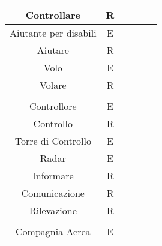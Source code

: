 \begin{tabular}{ | c  c  c | c  c  c | }
	\hline
	\textsf{\small Controllare} & \textsf{\small R} & \textsf{\small $ $} & \textsf{\small } & \textsf{\small } & \textsf{\small $ $}\\
	\hline
	\textsf{\small Aiutante per disabili} & \textsf{\small E} & \textsf{\small $ $} & \textsf{\small } & \textsf{\small } & \textsf{\small $ $}\\
	\hline
	\textsf{\small Aiutare} & \textsf{\small R} & \textsf{\small $ $} & \textsf{\small } & \textsf{\small } & \textsf{\small $ $}\\
	\hline
	\textsf{\small Volo} & \textsf{\small E} & \textsf{\small $ $} & \textsf{\small } & \textsf{\small } & \textsf{\small $ $}\\
	\hline
	\textsf{\small Volare} & \textsf{\small R} & \textsf{\small $ $} & \textsf{\small } & \textsf{\small } & \textsf{\small $ $}\\
	\hline
	\textsf{\small } & \textsf{\small } & \textsf{\small $ $} & \textsf{\small } & \textsf{\small } & \textsf{\small $ $} \\
	\hline
	\textsf{\small Controllore} & \textsf{\small E} & \textsf{\small $ $} & \textsf{\small } & \textsf{\small } & \textsf{\small $ $}\\
	\hline
	\textsf{\small Controllo} & \textsf{\small R} & \textsf{\small $ $} & \textsf{\small } & \textsf{\small } & \textsf{\small $ $}\\
	\hline
	\textsf{\small Torre di Controllo} & \textsf{\small E} & \textsf{\small $ $} & \textsf{\small } & \textsf{\small } & \textsf{\small $ $}\\
	\hline
	\textsf{\small Radar} & \textsf{\small E} & \textsf{\small $ $} & \textsf{\small } & \textsf{\small } & \textsf{\small $ $}\\
	\hline
	\textsf{\small Informare} & \textsf{\small R} & \textsf{\small $ $} & \textsf{\small } & \textsf{\small } & \textsf{\small $ $}\\
	\hline
	\textsf{\small Comunicazione} & \textsf{\small R} & \textsf{\small $ $} & \textsf{\small } & \textsf{\small } & \textsf{\small $ $}\\
	\hline
	\textsf{\small Rilevazione} & \textsf{\small R} & \textsf{\small $ $} & \textsf{\small } & \textsf{\small } & \textsf{\small $ $}\\
	\hline
	\textsf{\small } & \textsf{\small } & \textsf{\small $ $} & \textsf{\small } & \textsf{\small } & \textsf{\small $ $}\\
	\hline
	\textsf{\small Compagnia Aerea} & \textsf{\small E} & \textsf{\small $ $} & \textsf{\small } & \textsf{\small } & \textsf{\small $ $}\\

\end{tabular}

